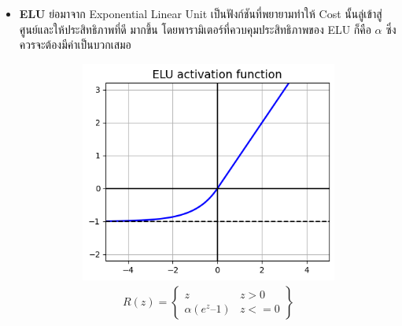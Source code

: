 \begin{itemize}
    \item \textbf{ELU} ย่อมาจาก Exponential Linear Unit เป็นฟังก์ชันที่พยายามทำให้ Cost นั้นลู่เข้าสู่ศูนย์และให้ประสิทธิภาพที่ดี%
          มากขึ้น โดยพารามิเตอร์ที่ควบคุมประสิทธิภาพของ ELU ก็คือ $\alpha$ ซึ่งควรจะต้องมีค่าเป็นบวกเสมอ
          \begin{figure}[H]
              \centering
              \begin{subfigure}{0.5\textwidth}
                  \centering
                  \includegraphics[width=0.9\linewidth]{fig/actfunc_elu.png}
                  \caption{%
                      \begin{equation}
                          \begin{split}R(z) =
                              \begin{Bmatrix}
                                  z                & z > 0  \\
                                  \alpha (e^z – 1) & z <= 0
                              \end{Bmatrix}
                          \end{split}
                      \end{equation}
                  }
                  \label{fig:actfunc_elu}
              \end{subfigure}%
              \begin{subfigure}{0.5\textwidth}
                  \centering

\end{subfigure}
\end{figure}
\end{itemize}
